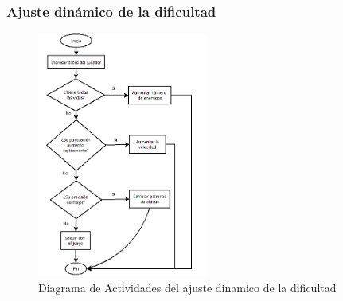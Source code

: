 \subsubsection{Ajuste dinámico de la dificultad}

\begin{figure}[H]
    \centering
    \includegraphics[width=0.5\textwidth]{recursos/Imagenes/DiagramaDificultad.png} 
    \caption{Diagrama de Actividades del ajuste dinamico de la dificultad}
    \label{fig:mi_imagen}
\end{figure}